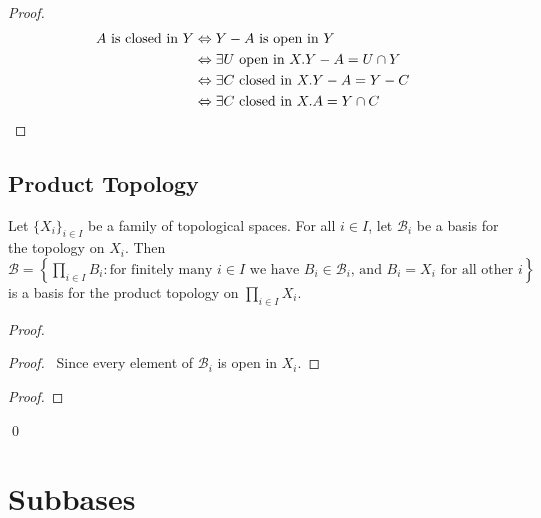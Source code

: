 \begin{proof}
\pf
\begin{align*}
A \text{ is closed in } Y & \Leftrightarrow Y - A \text{ is open in } Y \\
& \Leftrightarrow \exists U \text{ open in } X. Y - A = U \cap Y \\
& \Leftrightarrow \exists C \text{ closed in } X. Y - A = Y - C \\
& \Leftrightarrow \exists C \text{ closed in } X. A = Y \cap C & \qed
\end{align*}
\end{proof}

\subsection{Product Topology}

\begin{prop}
Let $\{X_i\}_{i \in I}$ be a family of topological spaces. For all $i \in I$, let $\mathcal{B}_i$ be a basis for the topology on $X_i$. Then $\mathcal{B} = \left\{ \prod_{i \in I} B_i : \text{for finitely many $i \in I$ we have $B_i \in \mathcal{B}_i$, and $B_i = X_i$ for all other $i$} \right\}$ is a basis for the product topology on $\prod_{i \in I} X_i$.
\end{prop}

\begin{proof}
\pf
{}
\begin{proof}
	\pf\ Since every element of $\mathcal{B}_i$ is open in $X_i$.
\end{proof}
\begin{proof}
\end{proof}
\qed
\end{proof}

\section{Subbases}

